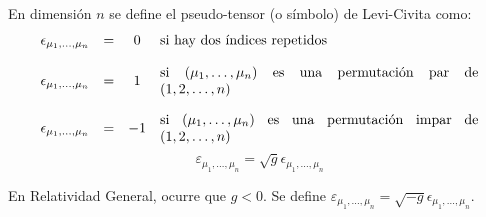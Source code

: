 En dimensión $n$ se define el pseudo-tensor (o símbolo) de Levi-Civita como:
$$
\begin{array}{cccc}
     \epsilon_{\mu_1,\ldots , \mu_n}&=&0&\text{\parbox{8cm}{si hay dos índices repetidos}}  \\\\
     \epsilon_{\mu_1,\ldots , \mu_n}&=&1&\text{\parbox{8cm}{si $(\mu_1,\ldots , \mu_n)$ es una permutación par de $(1,2,\ldots , n)$}}\\\\
     \epsilon_{\mu_1,\ldots , \mu_n}&=&-1&\text{\parbox{8cm}{si $(\mu_1,\ldots , \mu_n)$ es una permutación impar de $(1,2,\ldots , n)$}}
\end{array}
$$
$$
\boxed{\varepsilon_{\mu_1,\ldots , \mu_n}=\sqrt{g}\epsilon_{\mu_1,\ldots , \mu_n}}
$$

En Relatividad General, ocurre que $g<0$. Se define $\varepsilon_{\mu_1,\ldots , \mu_n}=\sqrt{-g}\epsilon_{\mu_1,\ldots , \mu_n}$.